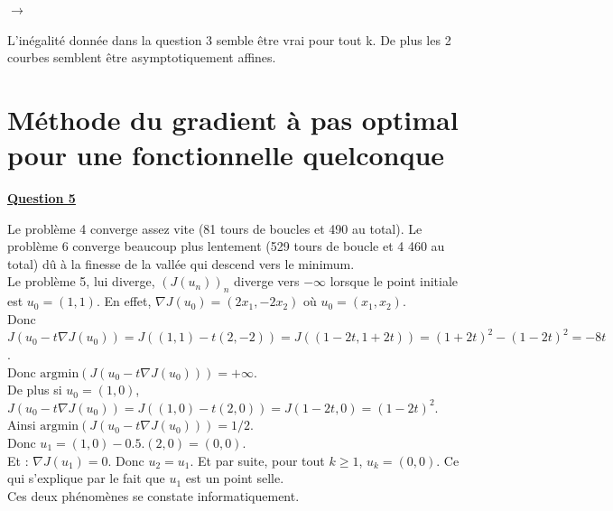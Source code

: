 \documentclass[12pt,a4paper]{article}
\begin{document}
	\vspace{.5cm}
	
	$\longrightarrow$ \begin{minipage}[t]{18 cm}
		L'inégalité donnée dans la question 3 semble être vrai pour tout k. De plus les 2 courbes semblent être asymptotiquement affines.
	\end{minipage}
	
\section{Méthode du gradient à pas optimal pour une fonctionnelle quelconque}
	
\textbf{\underline{Question 5}}

\vspace{.5cm}

Le problème 4 converge assez vite (81 tours de boucles et 490 au total). Le problème 6 converge beaucoup plus lentement (529 tours de boucle et 4 460 au total) dû à la finesse de la vallée qui descend vers le minimum.\\

Le problème 5, lui diverge, $(J(u_n))_n$ diverge vers $-\infty$ lorsque le point initiale est $u_0 = (1,1)$. En effet, $\nabla J(u_0) = (2x_1, -2x_2)$ où $u_0 = (x_1,x_2)$.\\ 
Donc $J(u_0-t\nabla J(u_0)) = J((1,1)-t(2,-2))=J((1-2t,1+2t)) = (1+2t)^2-(1-2t)^2 = -8t$.\\
 Donc $\text{argmin}\left( J(u_0-t\nabla J(u_0)) \right) = + \infty$.\\
 
 De plus si $u_0 = (1,0)$, $J(u_0-t\nabla J(u_0)) = J((1,0) - t(2,0)) = J(1-2t,0) = (1-2t)^2$. Ainsi $\text{argmin}\left( J(u_0-t\nabla J(u_0)) \right) = 1/2$.\\
 Donc $u_1 = (1,0)-0.5.(2,0)=(0,0)$.\\
 Et : $\nabla J(u_1) = 0$. Donc $u_2 = u_1$. Et par suite, pour tout $k \geq 1$, $u_k = (0,0)$. Ce qui s'explique par le fait que $u_1$ est un point selle.\\
 
 Ces deux phénomènes se constate informatiquement.
	
	
	
	
\end{document}
